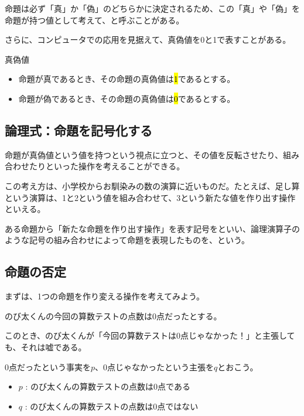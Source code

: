 \documentclass[../../imaging-math]{subfiles}
\begin{document}
命題は必ず「真」か「偽」のどちらかに決定されるため、この「真」や「偽」を命題が持つ値として考えて、と呼ぶことがある。

さらに、コンピュータでの応用を見据えて、真偽値を0と1で表すことがある。

\begin{definition}{真偽値}
  \begin{itemize}
    \item 命題が真であるとき、その命題の真偽値は\hl{1}であるとする。
    \item 命題が偽であるとき、その命題の真偽値は\hl{0}であるとする。
  \end{itemize}
\end{definition}

\subsection{論理式：命題を記号化する}

命題が真偽値という値を持つという視点に立つと、その値を反転させたり、組み合わせたりといった操作を考えることができる。

この考え方は、小学校からお馴染みの数の演算に近いものだ。たとえば、足し算という演算は、1と2という値を組み合わせて、3という新たな値を作り出す操作といえる。

\br

ある命題から「新たな命題を作り出す操作」を表す記号をといい、論理演算子のような記号の組み合わせによって命題を表現したものを、という。

\subsection{命題の否定}

まずは、1つの命題を作り変える操作を考えてみよう。

\br

のび太くんの今回の算数テストの点数は0点だったとする。

このとき、のび太くんが「今回の算数テストは0点じゃなかった！」と主張しても、それは嘘である。

\br

0点だったという事実を$p$、0点じゃなかったという主張を$q$とおこう。

\begin{itemize}
  \item $p$ : のび太くんの算数テストの点数は0点である
  \item $q$ : のび太くんの算数テストの点数は0点ではない
\end{itemize}
\end{document}
